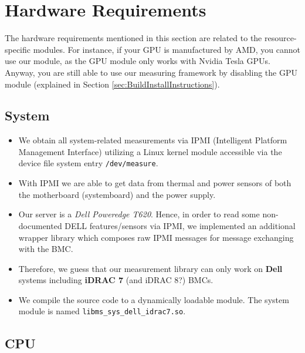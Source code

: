 %
%
%
%
%
%

\section{Hardware Requirements}
\label{sec:hardware}

The hardware requirements mentioned in this section are related to the resource-specific modules. For instance, if your GPU is manufactured by AMD, you cannot use our module, as the GPU module only works with Nvidia Tesla GPUs. Anyway, you are still able to use our measuring framework by disabling the GPU module (explained in Section \ref{sec:BuildInstallInstructions}).

\subsection{System}

\begin{itemize}
	\item We obtain all system-related measurements via IPMI (Intelligent Platform Management Interface) utilizing a Linux kernel module accessible via the device file system entry \texttt{/dev/measure}.
	\item With IPMI we are able to get data from thermal and power sensors of both the motherboard (systemboard) and the power supply.
	\item Our server is a \textit{Dell Poweredge T620}. Hence, in order to read some non-documented DELL features/sensors via IPMI, we implemented an additional wrapper library which composes raw IPMI messages for message exchanging with the BMC.
	\item Therefore, we guess that our measurement library can only work on \textbf{Dell} systems including \textbf{iDRAC 7} (and iDRAC 8?) BMCs.
	\item We compile the source code to a dynamically loadable module. The system module is named \texttt{libms\_sys\_dell\_idrac7.so}.
\end{itemize}

\subsection{CPU}

